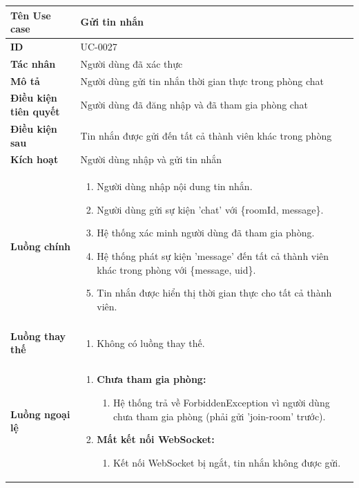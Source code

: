 {
\renewcommand{\arraystretch}{1.5}

\begin{tabularx}{\textwidth}{|>{\raggedright\arraybackslash}X|>{\raggedright\arraybackslash}X|}
\hline
\textbf{Tên Use case} & Gửi tin nhắn \\
\hline
\textbf{ID} & UC-0027 \\
\hline
\textbf{Tác nhân} & Người dùng đã xác thực \\
\hline
\textbf{Mô tả} & Người dùng gửi tin nhắn thời gian thực trong phòng chat \\
\hline
\textbf{Điều kiện tiên quyết} & Người dùng đã đăng nhập và đã tham gia phòng chat \\
\hline
\textbf{Điều kiện sau} & Tin nhắn được gửi đến tất cả thành viên khác trong phòng \\
\hline
\textbf{Kích hoạt} & Người dùng nhập và gửi tin nhắn \\
\hline
\textbf{Luồng chính} &
\begin{enumerate}
    \item Người dùng nhập nội dung tin nhắn.
    \item Người dùng gửi sự kiện 'chat' với \{roomId, message\}.
    \item Hệ thống xác minh người dùng đã tham gia phòng.
    \item Hệ thống phát sự kiện 'message' đến tất cả thành viên khác trong phòng với \{message, uid\}.
    \item Tin nhắn được hiển thị thời gian thực cho tất cả thành viên.
\end{enumerate} \\
\hline
\textbf{Luồng thay thế} &
\begin{enumerate}
    \item Không có luồng thay thế.
\end{enumerate} \\
\hline
\textbf{Luồng ngoại lệ} &
\begin{enumerate}
    \item \textbf{Chưa tham gia phòng:}
    \begin{enumerate}
        \item[3Err.] Hệ thống trả về ForbiddenException vì người dùng chưa tham gia phòng (phải gửi 'join-room' trước).
    \end{enumerate}
    \item \textbf{Mất kết nối WebSocket:}
    \begin{enumerate}
        \item[2Err.] Kết nối WebSocket bị ngắt, tin nhắn không được gửi.
    \end{enumerate}
\end{enumerate} \\
\hline
\end{tabularx}
}

